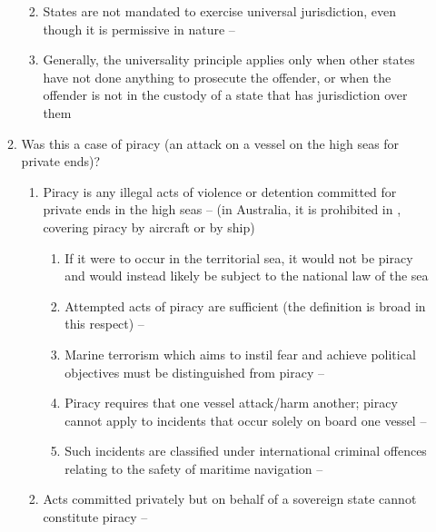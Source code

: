 \begin{enumerate}
\begin{enumerate}
\begin{enumerate}
\begin{enumerate}
            \end{enumerate}
            \item States are not mandated to exercise universal jurisdiction, even though it is permissive in nature -- 
            \item Generally, the universality principle applies only when other states have not done anything to prosecute the offender, or when the offender is not in the custody of a state that has jurisdiction over them
        \end{enumerate}
        \item Was this a case of piracy (an attack on a vessel on the high seas for private ends)?
        \begin{enumerate}
            \item Piracy is any illegal acts of violence or detention committed for private ends in the high seas --  (in Australia, it is prohibited in , covering piracy by aircraft or by ship)
            \begin{enumerate}
                \item If it were to occur in the territorial sea, it would not be piracy and would instead likely be subject to the national law of the sea
                \item Attempted acts of piracy are sufficient (the  definition is broad in this respect) -- 
                \item Marine terrorism which aims to instil fear and achieve political objectives must be distinguished from piracy -- 
                \item Piracy requires that one vessel attack/harm another; piracy cannot apply to incidents that occur solely on board one vessel -- 
                \item Such incidents are classified under international criminal offences relating to the safety of maritime navigation -- 
            \end{enumerate}
            \item Acts committed privately but on behalf of a sovereign state cannot constitute piracy -- 

\end{enumerate}
\end{enumerate}
\end{enumerate}
